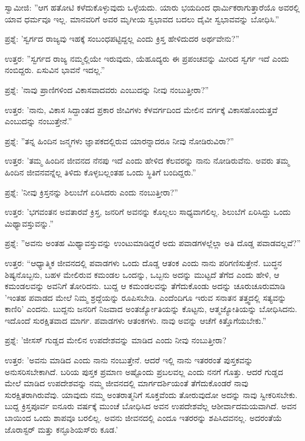 ಸ್ವಾಮೀಜಿ: ''ಆಗ ಹತೋಟಿ ಕಳೆದುಕೊಳ್ಳುವುದು ಒಳ್ಳೆಯದು. ಯಾರು ಭಯದಿಂದ ಧಾರ್ಮಿಕರಾಗುತ್ತಾರೆಯೊ ಅವರಲ್ಲಿ ಯಾವ ಧರ್ಮವೂ ಇಲ್ಲ. ಮಾನವರಿಗೆ ಅವರ ಮೃಗೀಯ ಸ್ವಭಾವದ ಬದಲು ದೈವೀ ಸ್ವಭಾವವನ್ನು ಬೋಧಿಸಿ.”

ಪ್ರಶ್ನೆ: 'ಸ್ವರ್ಗದ ರಾಜ್ಯವು ಇಹಕ್ಕೆ ಸಂಬಂಧಪಟ್ಟಿದ್ದಲ್ಲ ಎಂದು ಕ್ರಿಸ್ತ ಹೇಳಿದುದರ ಅರ್ಥವೇನು?''

ಉತ್ತರ: ''ಸ್ವರ್ಗದ ರಾಜ್ಯ ನಮ್ಮಲ್ಲಿಯೇ ಇರುವುದು, ಯೆಹೂದ್ಯರು ಈ ಪ್ರಪಂಚವನ್ನು ಮೀರಿದ ಸ್ವರ್ಗ ಇದೆ ಎಂದು ನಂಬಿದ್ದರು. ಏಸುವಿನ ಭಾವನೆ ಇದಲ್ಲ.”

ಪ್ರಶ್ನೆ: 'ನಾವು ಪ್ರಾಣಿಗಳಿಂದ ವಿಕಾಸವಾದವರು ಎಂಬುದನ್ನು ನೀವು ನಂಬುತ್ತೀರಾ?''

ಉತ್ತರ: 'ನಾನು, ವಿಕಾಸ ಸಿದ್ದಾಂತದ ಪ್ರಕಾರ ಜೀವಿಗಳು ಕೆಳವರ್ಗದಿಂದ ಮೇಲಿನ ವರ್ಗಕ್ಕೆ ವಿಕಾಸಹೊಂದುತ್ತವೆ ಎಂಬುದನ್ನು ನಂಬುತ್ತೇನೆ.”

ಪ್ರಶ್ನೆ: ''ತನ್ನ ಹಿಂದಿನ ಜನ್ಮಗಳು ಜ್ಞಾಪಕದಲ್ಲಿರುವ ಯಾರನ್ನಾದರೂ ನೀವು ನೋಡಿರುವಿರಾ?”

ಉತ್ತರ: 'ತಮ್ಮ ಹಿಂದಿನ ಜೀವನದ ನೆನಪು ಇದೆ ಎಂದು ಹೇಳಿದ ಕೆಲವರನ್ನು ನಾನು ನೋಡಿರುವೆನು. ಅವರು ತಮ್ಮ ಹಿಂದಿನ ಜೀವನವನ್ನೆಲ್ಲ ತಿಳಿದು ಕೊಳ್ಳಬಲ್ಲಂತಹ ಒಂದು ಸ್ಥಿತಿಗೆ ಬಂದಿದ್ದರು.''

ಪ್ರಶ್ನೆ: 'ನೀವು ಕ್ರಿಸ್ತನನ್ನು ಶಿಲುಬೆಗೆ ಏರಿಸಿದರು ಎಂದು ನಂಬುತ್ತೀರಾ?”

ಉತ್ತರ: 'ಭಗವಂತನ ಅವತಾರವೆ ಕ್ರಿಸ್ತ, ಜನರಿಗೆ ಅವನನ್ನು ಕೊಲ್ಲಲು ಸಾಧ್ಯವಾಗಲಿಲ್ಲ. ಶಿಲುಬೆಗೆ ಏರಿಸಿದ್ದು ಒಂದು ಮಿಥ್ಯಾವಸ್ತುವನ್ನು.”

ಪ್ರಶ್ನೆ: ''ಅವನು ಅಂತಹ ಮಿಥ್ಯಾವಸ್ತುವನ್ನು ಉಂಟುಮಾಡಿದ್ದರೆ ಅದು ಪವಾಡಗಳಲ್ಲೆಲ್ಲಾ ಅತಿ ದೊಡ್ಡ ಪವಾಡವಲ್ಲವೆ?”

ಉತ್ತರ: “ಆಧ್ಯಾತ್ಮಿಕ ಜೀವನದಲ್ಲಿ ಪವಾಡಗಳು ಒಂದು ದೊಡ್ಡ ಆತಂಕ ಎಂದು ನಾನು ಪರಿಗಣಿಸುತ್ತೇನೆ. ಬುದ್ಧನ ಶಿಷ್ಯನೊಬ್ಬನು, ಬಹಳ ಮೇಲಿರುವ ಕಮಂಡಲ ಒಂದನ್ನು, ಒಬ್ಬನು ಅದನ್ನು ಮುಟ್ಟದೆ ತೆಗೆದ ಎಂದು ಹೇಳಿ, ಆ ಕಮಂಡಲವನ್ನು ಅವನಿಗೆ ತೋರಿದನು. ಬುದ್ದ ಆ ಕಮಂಡಲವನ್ನು ತೆಗೆದುಕೊಂಡು ಅದನ್ನು ಚೂರುಚೂರುಮಾಡಿ 'ಇಂತಹ ಪವಾಡದ ಮೇಲೆ ನಿಮ್ಮ ಶ್ರದ್ದೆಯನ್ನು ರೂಪಿಸಬೇಡಿ. ಎಂದೆಂದಿಗೂ ಇರುವ ಸನಾತನ ತತ್ತ್ವದಲ್ಲಿ ಸತ್ಯವನ್ನು ಕಾಣಿರಿ' ಎಂದನು. ಬುದ್ದನು ಜನರಿಗೆ ನಿಜವಾದ ಅಂತರ್ಜ್ಯೋತಿಯನ್ನು ಕೊಟ್ಟನು, ಆತ್ಮಜ್ಯೋತಿಯನ್ನು ಬೋಧಿಸಿದನು. ಇದೊಂದೆ ಸುರಕ್ಷಿತವಾದ ಮಾರ್ಗ. ಪವಾಡಗಳು ಆತಂಕಗಳು. ನಾವು ಅವನ್ನು ಆಚೆಗೆ ಕಿತ್ತೊಗೆಯಬೇಕು.”

ಪ್ರಶ್ನೆ: 'ಜೀಸಸ್ ಗುಡ್ಡದ ಮೇಲಿನ ಉಪದೇಶವನ್ನು ಮಾಡಿದ ಎಂದು ನೀವು ನಂಬುತ್ತೀರಾ?

ಉತ್ತರ: 'ಅವನು ಮಾಡಿದ ಎಂದು ನಾನು ನಂಬುತ್ತೇನೆ. ಆದರೆ ಇಲ್ಲಿ ನಾನು ಇತರರಂತೆ ಪುಸ್ತಕವನ್ನು ಅನುಸರಿಸಬೇಕಾಗಿದೆ. ಬರಿಯ ಪುಸ್ತಕ ಪ್ರಮಾಣ ಅಷ್ಟೊಂದು ಪ್ರಬಲವಲ್ಲ ಎಂದು ನನಗೆ ಗೊತ್ತು. ಆದರೆ ಗುಡ್ಡದ ಮೇಲೆ ಮಾಡಿದ ಉಪದೇಶವನ್ನು ನಮ್ಮ ಜೀವನದಲ್ಲಿ ಮಾರ್ಗದರ್ಶಿಯಂತೆ ತೆಗೆದುಕೊಂಡರೆ ನಾವು ಸುರಕ್ಷಿತರಾಗಿರುವೆವು. ಯಾವುದು ನಮ್ಮ ಅಂತರಾತ್ಮನಿಗೆ ಸೂಕ್ತವೆಂದು ತೋರುವುದೋ ಅದನ್ನು ನಾವು ಸ್ವೀಕರಿಸಬೇಕು. ಬುದ್ದ ಕ್ರಿಸ್ತಪೂರ್ವ ಐನೂರು ವರ್ಷಕ್ಕೆ ಮುಂಚೆ ಬೋಧಿಸಿದ ಅವನ ಉಪದೇಶವೆಲ್ಲ ಆಶೀರ್ವಾದಮಯವಾಗಿದೆ. ಅವನ ಬಾಯಿಂದ ಒಂದು ಶಾಪವೂ ಬರಲಿಲ್ಲ. ಅವನು ಜೀವನದಲ್ಲಿ ಎಂದೂ ಇತರರನ್ನು ಶಪಿಸಿದವನಲ್ಲ. ಅದರಂತೆಯೆ ಜೊರಾಸ್ಟರ್‌ ಮತ್ತು ಕನ್ಫೂಶಿಯಸ್‌ರು ಕೂಡ.'

